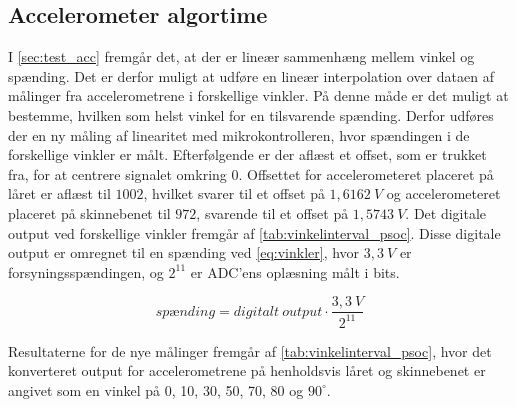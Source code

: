 \subsection{Accelerometer algortime}\label{sec:imp_vinkler}
I \autoref{sec:test_acc} fremgår det, at der er lineær sammenhæng mellem vinkel og spænding. Det er derfor muligt at udføre en lineær interpolation over dataen af målinger fra accelerometrene i forskellige vinkler. På denne måde er det muligt at bestemme, hvilken som helst vinkel for en tilsvarende spænding. 
Derfor udføres der en ny måling af linearitet med mikrokontrolleren, hvor spændingen i de forskellige vinkler er målt. Efterfølgende er der aflæst et offset, som er trukket fra, for at centrere signalet omkring 0. Offsettet for accelerometeret placeret på låret er aflæst til $1002$, hvilket svarer til et offset på $1,6162~V$ og accelerometeret placeret på skinnebenet til $972$, svarende til et offset på $1,5743~V$. Det digitale output ved forskellige vinkler fremgår af \autoref{tab:vinkelinterval_psoc}. Disse digitale output er omregnet til en spænding ved \autoref{eq:vinkler}, hvor $3,3~V$ er forsyningsspændingen, og $2^{11}$ er ADC'ens oplæsning målt i bits.  

\begin{equation}
\label{eq:vinkler}
sp\text{æ}nding =digitalt~output\cdot \dfrac{3,3~V}{2^{11}}
\end{equation}

\noindent
Resultaterne for de nye målinger fremgår af \autoref{tab:vinkelinterval_psoc}, hvor det konverteret output for accelerometrene på henholdsvis låret og skinnebenet er angivet som en vinkel på 0, 10, 30, 50, 70, 80 og $90^{\circ}.$ 

